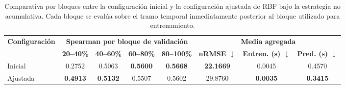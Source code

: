\begin{table}[H]
    \centering
    \small
    \setlength{\tabcolsep}{5pt}
    \begin{adjustbox}{max width=\textwidth}
        \begin{tabular}{l|cccc|ccc}
            \toprule
            \multirow{2}{*}{\textbf{Configuración}}
                             & \multicolumn{4}{c|}{\textbf{Spearman por bloque de validación}}
                             & \multicolumn{3}{c}{\textbf{Media agregada}}                                                                                                   \\
            \cmidrule(lr){2-5} \cmidrule(lr){6-8}
                             & \textbf{20--40\%}
                             & \textbf{40--60\%}
                             & \textbf{60--80\%}
                             & \textbf{80--100\%}
                             & \textbf{nRMSE $\downarrow$}
                             & \textbf{Entren. (s) $\downarrow$}
                             & \textbf{Pred. (s) $\downarrow$}                                                                                                                \\
            \midrule
            Inicial          & 0.2752          & 0.5063          & \textbf{0.5600} & \textbf{0.5668} & \textbf{22.1669} & 0.0045          & 0.4570          \\
            Ajustada         & \textbf{0.4913} & \textbf{0.5132} & 0.5507          & 0.5602          & 29.8760          & \textbf{0.0035} & \textbf{0.3415} \\
            \bottomrule
        \end{tabular}
    \end{adjustbox}
    \caption{Comparativa por bloques entre la configuración inicial y la configuración ajustada de RBF bajo la estrategia no acumulativa. Cada bloque se evalúa sobre el tramo temporal inmediatamente posterior al bloque utilizado para entrenamiento.}
    \label{tab:comparativa_rbf_inicial_ajustada_bloques}
\end{table}

